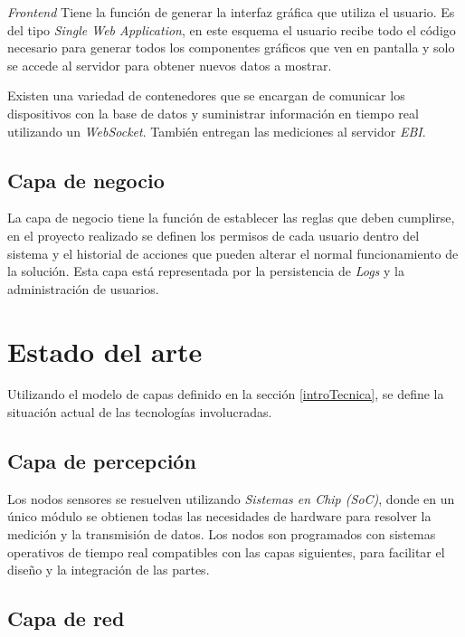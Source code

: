 		\emph{Frontend} Tiene la función de generar la interfaz gráfica que utiliza el usuario. Es del tipo \emph{Single Web Application}, en este esquema el usuario recibe todo el código necesario para generar todos los componentes gráficos que ven en pantalla y solo se accede al servidor para obtener nuevos datos a mostrar.
		
		Existen una variedad de contenedores que se encargan de comunicar los dispositivos con la base de datos y suministrar información en tiempo real utilizando un \emph{WebSocket}. También entregan las mediciones al servidor \emph{EBI}.
	
	\subsection{Capa de negocio}
	\label{capaNegocio}
	
		La capa de negocio tiene la función de establecer las reglas que deben cumplirse, en el proyecto realizado se definen los permisos de cada usuario dentro del sistema y el historial de acciones que pueden alterar el normal funcionamiento de la solución. Esta capa está representada por la persistencia de \emph{Logs} y la administración de usuarios.

\section{Estado del arte}
\label{estadoArte}

	Utilizando el modelo de capas definido en la sección \ref{introTecnica}, se define la situación actual de las tecnologías involucradas.
	
	\subsection{Capa de percepción}
	\label{artPercepcion}
	
		Los nodos sensores se resuelven utilizando \emph{Sistemas en Chip (SoC)}, donde en un único módulo se obtienen todas las necesidades de hardware para resolver la medición y la transmisión de datos. Los nodos son programados con sistemas operativos de tiempo real compatibles con las capas siguientes, para facilitar el diseño y la integración de las partes.
	
	\subsection{Capa de red}
	\label{artRed}
	
